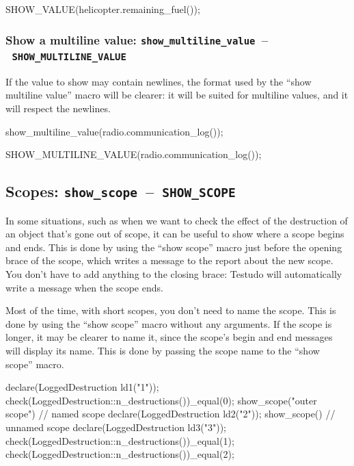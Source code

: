 \documentclass[twoside, a4paper, article]{memoir}
\newcommand*\testudocolor{\color{red!80!blue}}
\newcommand*\testudo[1]{\texttt{\testudocolor{}#1}}
\newcommand*\testudopair[2]{\testudo{#1}~--~\testudo{#2}}
\begin{document}
\begin{cpplisting}
SHOW_VALUE(helicopter.remaining_fuel());
\end{cpplisting}

\subsubsection{Show a multiline value:
  \testudopair{show\_multiline\_value}{SHOW\_MULTILINE\_VALUE}}
\label{sec:show-multiline-value}

If the value to show may contain newlines, the format used by the ``show
multiline value'' macro will be clearer: it will be suited for multiline
values, and it will respect the newlines.

\begin{cpplisting}
show_multiline_value(radio.communication_log());
\end{cpplisting}

\begin{cpplisting}
SHOW_MULTILINE_VALUE(radio.communication_log());
\end{cpplisting}

\subsection{Scopes: \testudopair{show\_scope}{SHOW\_SCOPE}}
\label{sec:scopes}

In some situations, such as when we want to check the effect of the destruction
of an object that's gone out of scope, it can be useful to show where a scope
begins and ends.  This is done by using the ``show scope'' macro just before
the opening brace of the scope, which writes a message to the report about the
new scope.  You don't have to add anything to the closing brace: Testudo will
automatically write a message when the scope ends.

Most of the time, with short scopes, you don't need to name the scope.  This is
done by using the ``show scope'' macro without any arguments.  If the scope is
longer, it may be clearer to name it, since the scope's begin and end messages
will display its name.  This is done by passing the scope name to the ``show
scope'' macro.

\begin{cpplisting}
declare(LoggedDestruction ld1("1"));
check(LoggedDestruction::n_destructions())_equal(0);
show_scope("outer scope") { // named scope
  declare(LoggedDestruction ld2("2"));
  show_scope() { // unnamed scope
    declare(LoggedDestruction ld3("3"));
  }
  check(LoggedDestruction::n_destructions())_equal(1);
}
check(LoggedDestruction::n_destructions())_equal(2);
\end{cpplisting}
\end{document}
